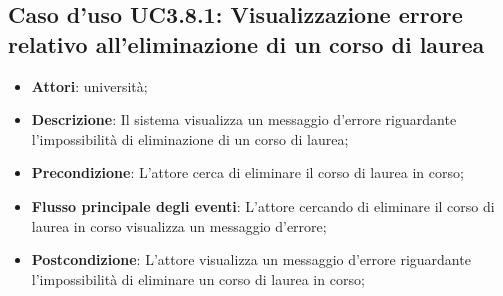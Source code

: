 \subsection{Caso d'uso \texorpdfstring{UC3.8.1}{UC3.8.1}: Visualizzazione errore relativo all’eliminazione di un corso di laurea}
\begin{itemize}
\item \textbf{Attori}: università;
\item \textbf{Descrizione}: Il sistema visualizza un messaggio d'errore riguardante l'impossibilità di eliminazione di un corso di laurea;

\item \textbf{Precondizione}: L'attore cerca di eliminare il corso di laurea in corso;

\item \textbf{Flusso principale degli eventi}: L'attore cercando di eliminare il corso di laurea in corso visualizza un messaggio d'errore;

\item \textbf{Postcondizione}: L'attore visualizza un messaggio d'errore riguardante l'impossibilità di eliminare un corso di laurea in corso;

\end{itemize}
